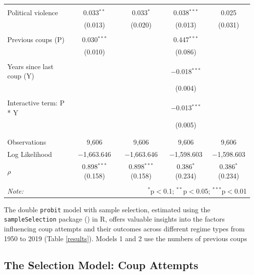 \documentclass[
  12pt,
]{report}
\begin{document}
\begin{table}[!htbp]
\begin{tabular}{@{\extracolsep{7pt}}lcccc}
  & & & & \\ 
 Political violence & 0.033$^{**}$ & 0.033$^{*}$ & 0.038$^{***}$ & 0.025 \\ 
  & (0.013) & (0.020) & (0.013) & (0.031) \\ 
  & & & & \\ 
 Previous coups (P) & 0.030$^{***}$ &  & 0.447$^{***}$ &  \\ 
  & (0.010) &  & (0.086) &  \\ 
  & & & & \\ 
 Years since last coup (Y) &  &  & $-$0.018$^{***}$ &  \\ 
  &  &  & (0.004) &  \\ 
  & & & & \\ 
 Interactive term: P * Y &  &  & $-$0.013$^{***}$ &  \\ 
  &  &  & (0.005) &  \\ 
  & & & & \\ 
\hline \\[-1.8ex] 
Observations & 9,606 & 9,606 & 9,606 & 9,606 \\ 
Log Likelihood & $-$1,663.646 & $-$1,663.646 & $-$1,598.603 & $-$1,598.603 \\ 
$\rho$ & 0.898$^{***}$  (0.158) & 0.898$^{***}$  (0.158) & 0.386$^{*}$  (0.234) & 0.386$^{*}$  (0.234) \\ 
\hline 
\hline \\[-1.8ex] 
\textit{Note:}  & \multicolumn{4}{r}{$^{*}$p$<$0.1; $^{**}$p$<$0.05; $^{***}$p$<$0.01} \\ 
\end{tabular} 
\end{table}

The double \texttt{probit} model with sample selection, estimated using
the \texttt{sampleSelection} package
() in R,
offers valuable insights into the factors influencing coup attempts and
their outcomes across different regime types from 1950 to 2019 (Table
\ref{results}). Models 1 and 2 use the numbers of previous coups

\newpage

\subsection{The Selection Model: Coup
Attempts}\label{the-selection-model-coup-attempts}

\begingroup
\setlength{}
\setlength{}\fontsize{12.0pt}{14.4pt}\selectfont
\setlength{\LTpost}{0mm}
\end{document}
